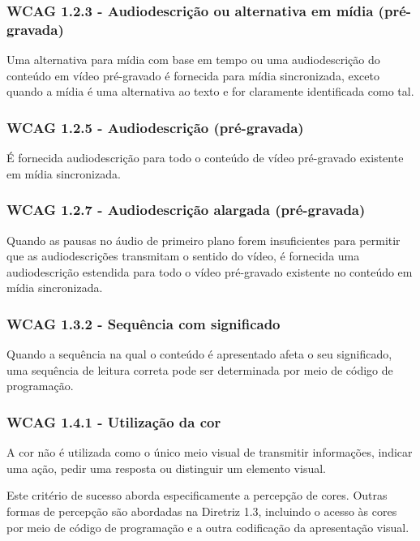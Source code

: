 \documentclass[a4paper]{article}
\begin{document}
\begin{titlepage}
\subsubsection{WCAG 1.2.3 - Audiodescrição ou alternativa em mídia (pré-gravada)}

Uma alternativa para mídia com base em tempo ou uma audiodescrição do conteúdo em vídeo pré-gravado é fornecida para mídia sincronizada, exceto quando a mídia é uma alternativa ao texto e for claramente identificada como tal.

\subsubsection{WCAG 1.2.5 - Audiodescrição (pré-gravada)}

É fornecida audiodescrição para todo o conteúdo de vídeo pré-gravado existente em mídia sincronizada.

\subsubsection{WCAG 1.2.7 - Audiodescrição alargada (pré-gravada)}

Quando as pausas no áudio de primeiro plano forem insuficientes para permitir que as audiodescrições transmitam o sentido do vídeo, é fornecida uma audiodescrição estendida para todo o vídeo pré-gravado existente no conteúdo em mídia sincronizada.

\subsubsection{WCAG 1.3.2 - Sequência com significado}

Quando a sequência na qual o conteúdo é apresentado afeta o seu significado, uma sequência de leitura correta pode ser determinada por meio de código de programação.

\subsubsection{WCAG 1.4.1 - Utilização da cor}

A cor não é utilizada como o único meio visual de transmitir informações, indicar uma ação, pedir uma resposta ou distinguir um elemento visual.

Este critério de sucesso aborda especificamente a percepção de cores. Outras formas de percepção são abordadas na Diretriz 1.3, incluindo o acesso às cores por meio de código de programação e a outra codificação da apresentação visual.


\end{titlepage}
\end{document}
